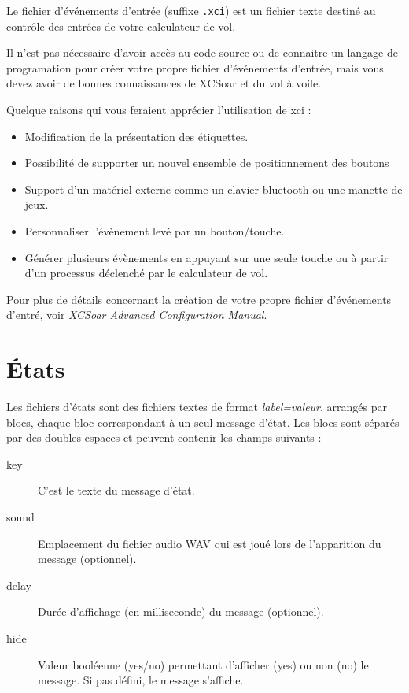 Le fichier d'événements d'entrée (suffixe  \verb|.xci|) est un fichier texte destiné au contrôle des entrées de votre calculateur de vol.

Il n'est pas nécessaire d'avoir accès au code source ou de connaitre un langage de programation pour créer votre propre fichier d'événements d'entrée, mais vous devez avoir de bonnes connaissances de XCSoar et du vol à voile.


Quelque raisons qui vous feraient apprécier l'utilisation de xci :
\begin{itemize}
\item Modification de la présentation des étiquettes.
\item Possibilité de supporter un nouvel ensemble de positionnement des boutons
\item Support d'un matériel externe comme un clavier bluetooth ou une manette de jeux.
\item Personnaliser l'évènement levé par un bouton/touche.
\item Générer plusieurs évènements en appuyant sur une seule touche ou à partir d'un processus déclenché par le calculateur de vol.
\end{itemize}

Pour plus de détails concernant la création de votre propre fichier d'événements d'entré, voir  {\em XCSoar Advanced Configuration Manual}.

\section{États}\label{sec:status-file}

Les fichiers d'états sont des fichiers textes de format {\em label=valeur}, arrangés par blocs, chaque bloc  correspondant à un seul message d'état. Les blocs sont séparés par des doubles espaces et peuvent contenir les champs suivants :
\begin{description}
\item[key]  C'est le texte du message d'état.
\item[sound] Emplacement du fichier audio WAV qui est joué lors de l'apparition du message (optionnel).
\item[delay] Durée d'affichage (en milliseconde) du message (optionnel).
\item[hide] Valeur booléenne (yes/no) permettant d'afficher (yes) ou non (no) le message. Si pas défini, le message s'affiche.
\end{description} 


